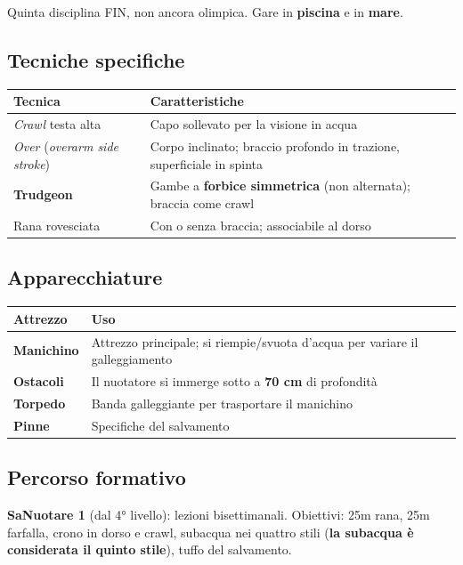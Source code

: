 \documentclass[12pt, a4paper]{article}
\begin{document}
Quinta disciplina FIN, non ancora olimpica. Gare in \textbf{piscina} e in \textbf{mare}.

\subsection{Tecniche specifiche}

\begin{tabularx}{\textwidth}{lX}
\toprule
\rowcolor{light} \textbf{Tecnica} & \textbf{Caratteristiche} \\
\midrule
\textit{Crawl} testa alta & Capo sollevato per la visione in acqua \\
\textit{Over} (\textit{overarm side stroke}) & Corpo inclinato; braccio profondo in trazione, superficiale in spinta \\
\textbf{Trudgeon} & Gambe a \textbf{forbice simmetrica} (non alternata); braccia come crawl \\
Rana rovesciata & Con o senza braccia; associabile al dorso \\
\bottomrule
\end{tabularx}

\subsection{Apparecchiature}

\begin{tabularx}{\textwidth}{lX}
\toprule
\rowcolor{light} \textbf{Attrezzo} & \textbf{Uso} \\
\midrule
\textbf{Manichino} & Attrezzo principale; si riempie/svuota d'acqua per variare il galleggiamento \\
\textbf{Ostacoli} & Il nuotatore si immerge sotto a \textbf{70 cm} di profondità \\
\textbf{Torpedo} & Banda galleggiante per trasportare il manichino \\
\textbf{Pinne} & Specifiche del salvamento \\
\bottomrule
\end{tabularx}

\subsection{Percorso formativo}

\textbf{SaNuotare 1} (dal 4° livello): lezioni bisettimanali. Obiettivi: 25m rana, 25m farfalla, crono in dorso e crawl, subacqua nei quattro stili (\textbf{la subacqua è considerata il quinto stile}), tuffo del salvamento.
\end{document}
